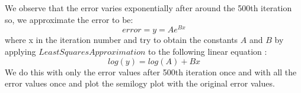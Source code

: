 \documentclass[11pt]{article}
\begin{document}
    \begin{center}
    \end{center}
    { \hspace*{\fill} \\}
    
    \begin{center}
    \end{center}
    { \hspace*{\fill} \\}
    
    We observe that the error varies exponentially after around the 500th
iteration so, we approximate the error to be:\\
\[error = y = Ae^{Bx}\] where x in the iteration number and try to
obtain the constants \(A\) and \(B\) by applying
\(Least Squares Approximation\) to the following linear equation :
\[log(y) = log(A) + Bx\] We do this with only the error values after
500th iteration once and with all the error values once and plot the
semilogy plot with the original error values.
\end{document}
